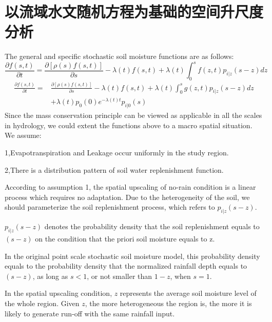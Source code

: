 

\chapter{以流域水文随机方程为基础的空间升尺度分析}










The general and specific stochastic soil moisture functions are as follows:
\begin{equation}
\frac{\partial{f(s,t)}}{\partial t}=\frac{\partial{[\rho(s)f(s,t)]}}{\partial s}-\lambda(t)f(s,t)+\lambda(t)\int_{0}^{s} f(z,t)p_{i|z}(s-z)dz
\end{equation}
\begin{equation}
 \begin{split}
 \frac{\partial{f(s,t)}}{\partial t}=&\frac{\partial{[\rho(s)f(s,t)]}}{\partial s}-\lambda(t)f(s,t)+\lambda(t)\int_{0}^{s} g(z,t)p_{i|z}(s-z)dz\\&+\lambda(t)p_0(0)e^{-\lambda(t) t}p_{i|0}(s)
 \end{split}
 \end{equation}
Since the mass conservation principle can be viewed as applicable in all the scales in hydrology, we could extent the functions above to a macro spatial situation. 
We assume:


1,Evapotranspiration and Leakage occur uniformly in the study region.

2,There is a distribution pattern of soil water replenishment function.



According to assumption 1, the spatial upscaling of no-rain condition is a linear process which requires no adaptation.
Due to the heterogeneity of the soil, we should parameterize the soil replenishment process, which refers to $p_{i|z}(s-z)$.

$p_{i|z}(s-z)$ denotes the probability density that the soil replenishment equals to $(s-z)$ on the condition that the priori soil moisture equals to z.
 
In the original point scale stochastic soil moisture model, this probability density equals to the probability density that the normalized rainfall depth equals to $(s-z)$, as long as $s<1$, or not smaller than $1-z$, when $s=1$.  

In the spatial upscaling condition, $z$ represents the average soil moisture level of the whole region. Given $z$, the more heterogeneous the region is, the more it is likely to generate run-off with the same rainfall input. 

